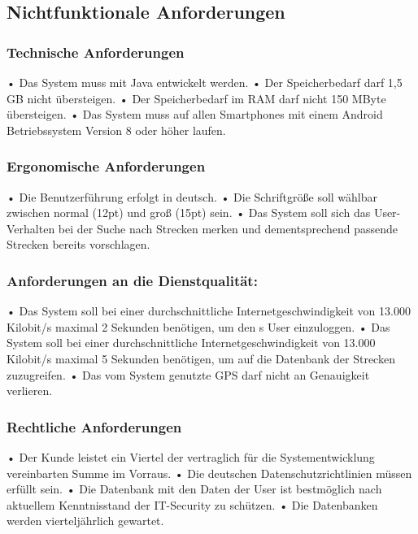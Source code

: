 \documentclass[a4paper, 12pp]{article}
\begin{document}
\subsection{Nichtfunktionale Anforderungen}
\subsubsection{Technische Anforderungen}
• Das System muss mit Java entwickelt werden.\newline
• Der Speicherbedarf darf 1,5 GB nicht übersteigen.\newline
• Der Speicherbedarf im RAM darf nicht 150 MByte übersteigen.\newline
• Das System muss auf allen Smartphones mit einem Android Betriebssystem Version 8 oder höher laufen.
\subsubsection{Ergonomische Anforderungen}
• Die Benutzerführung erfolgt in deutsch.\newline
• Die Schriftgröße soll wählbar zwischen normal (12pt) und groß (15pt) sein.\newline
• Das System soll sich das User-Verhalten bei der Suche nach Strecken merken und dementsprechend passende Strecken bereits vorschlagen.
\subsubsection{Anforderungen an die Dienstqualität:}
• Das System soll bei einer durchschnittliche Internetgeschwindigkeit von 13.000 Kilobit/s maximal 2 Sekunden benötigen, um den s User einzuloggen.\newline
• Das System soll bei einer durchschnittliche Internetgeschwindigkeit von 13.000 Kilobit/s maximal 5 Sekunden benötigen, um auf die Datenbank der Strecken zuzugreifen.\newline
• Das vom System genutzte GPS darf nicht an Genauigkeit verlieren.
\subsubsection{Rechtliche Anforderungen}
• Der Kunde leistet ein Viertel der vertraglich für die Systementwicklung vereinbarten Summe im Vorraus.\newline
• Die deutschen Datenschutzrichtlinien müssen erfüllt sein.\newline
• Die Datenbank mit den Daten der User ist bestmöglich nach aktuellem Kenntnisstand der IT-Security zu schützen.\newline
• Die Datenbanken werden vierteljährlich gewartet.
\end{document}
